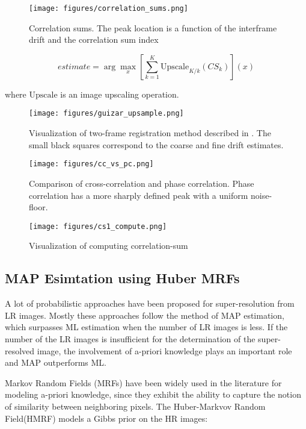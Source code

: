 \documentclass[10pt,twocolumn,letterpaper]{article}
\begin{document}
\begin{figure*}[ht]
    \centering
    \texttt{[image: figures/correlation\_sums.png]}
    \caption{Correlation sums.  The peak location is a function of the interframe drift and the correlation sum index}
    \label{fig:correlation_sums}
\end{figure*}

$$
estimate = \arg \max_x \left[\sum_{k=1}^K \text{Upscale}_{K/k}(CS_k)\right](x)
$$

where $\text{Upscale}$ is an image upscaling operation.


\begin{figure}[ht]
    \centering
    \texttt{[image: figures/guizar\_upsample.png]}
    \caption{Visualization of two-frame registration method described in \cite{guizar}.  The small black squares correspond to the coarse and fine drift estimates.}
    \label{fig:guizar_upsample}
\end{figure}

\begin{figure}[ht]
    \centering
    \texttt{[image: figures/cc\_vs\_pc.png]}
    \caption{Comparison of cross-correlation and phase correlation.  Phase correlation has a more sharply defined peak with a uniform noise-floor.}
    \label{fig:cc_vs_pc}
\end{figure}

\begin{figure*}[ht]
    \centering
    \texttt{[image: figures/cs1\_compute.png]}
    \caption{Visualization of computing correlation-sum}
    \label{fig:cs1_compute}
\end{figure*}

\subsection{MAP Esimtation using Huber MRFs}\label{sec:huber}

A lot of probabilistic approaches have been proposed for super-resolution from LR images. Mostly these approaches follow the method of MAP estimation, which surpasses ML estimation when the number of LR images is less. If the number of the LR images is insufficient for the determination of the super-resolved image, the involvement of a-priori knowledge plays an important role and MAP outperforms ML.

Markov Random Fields (MRFs) have been widely used in the literature
for modeling a-priori knowledge, since they exhibit the ability to capture the notion of similarity between neighboring pixels. The Huber-Markvov Random Field(HMRF) models a Gibbs prior on the HR images:
\end{document}
